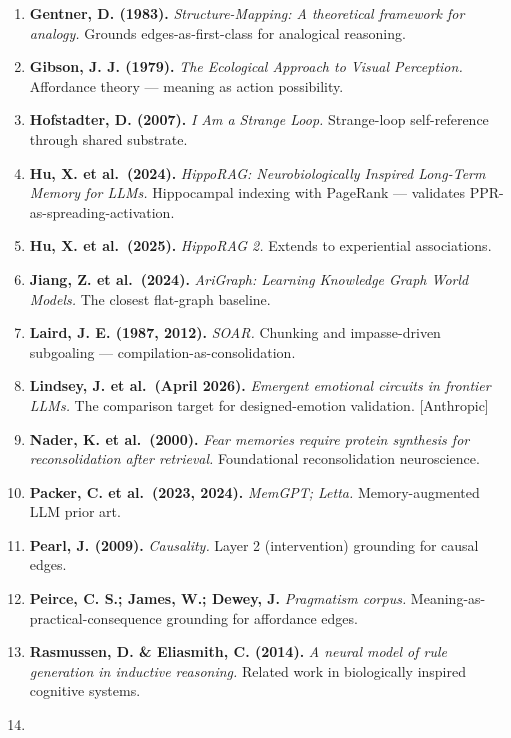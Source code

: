 \documentclass[12pt]{article}
\begin{document}
\begin{enumerate}
  \textbf{Friston, K. et al.~(2024).} \emph{Renormalizing Generative Models.} arXiv:2407.20292. ``Only active pathways require belief updating'' --- direct validation of spreading-activation-as-rendering.
\item
  \textbf{Gentner, D. (1983).} \emph{Structure-Mapping: A theoretical framework for analogy.} Grounds edges-as-first-class for analogical reasoning.
\item
  \textbf{Gibson, J. J. (1979).} \emph{The Ecological Approach to Visual Perception.} Affordance theory --- meaning as action possibility.
\item
  \textbf{Hofstadter, D. (2007).} \emph{I Am a Strange Loop.} Strange-loop self-reference through shared substrate.
\item
  \textbf{Hu, X. et al.~(2024).} \emph{HippoRAG: Neurobiologically Inspired Long-Term Memory for LLMs.} Hippocampal indexing with PageRank --- validates PPR-as-spreading-activation.
\item
  \textbf{Hu, X. et al.~(2025).} \emph{HippoRAG 2.} Extends to experiential associations.
\item
  \textbf{Jiang, Z. et al.~(2024).} \emph{AriGraph: Learning Knowledge Graph World Models.} The closest flat-graph baseline.
\item
  \textbf{Laird, J. E. (1987, 2012).} \emph{SOAR.} Chunking and impasse-driven subgoaling --- compilation-as-consolidation.
\item
  \textbf{Lindsey, J. et al.~(April 2026).} \emph{Emergent emotional circuits in frontier LLMs.} The comparison target for designed-emotion validation. {[}Anthropic{]}
\item
  \textbf{Nader, K. et al.~(2000).} \emph{Fear memories require protein synthesis for reconsolidation after retrieval.} Foundational reconsolidation neuroscience.
\item
  \textbf{Packer, C. et al.~(2023, 2024).} \emph{MemGPT; Letta.} Memory-augmented LLM prior art.
\item
  \textbf{Pearl, J. (2009).} \emph{Causality.} Layer 2 (intervention) grounding for causal edges.
\item
  \textbf{Peirce, C. S.; James, W.; Dewey, J.} \emph{Pragmatism corpus.} Meaning-as-practical-consequence grounding for affordance edges.
\item
  \textbf{Rasmussen, D. \& Eliasmith, C. (2014).} \emph{A neural model of rule generation in inductive reasoning.} Related work in biologically inspired cognitive systems.
\item

\end{enumerate}
\end{document}

